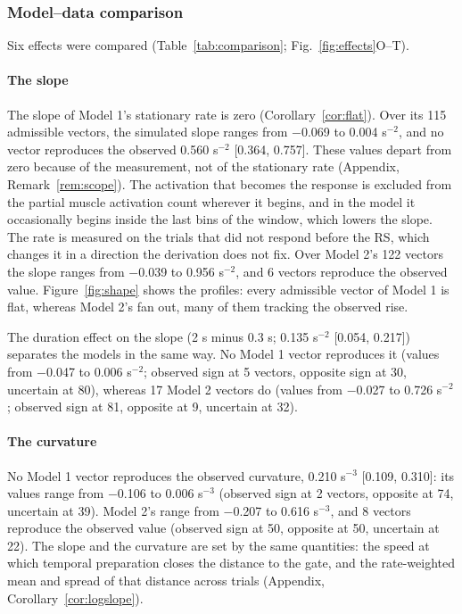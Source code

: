 \documentclass[a4paper,11pt]{article}
\theoremstyle{definition}
\newcommand{\1}{\mathbbm{1}}
\begin{document}
\subsubsection{Model--data comparison}

Six effects were compared (Table~\ref{tab:comparison}; Fig.~\ref{fig:effects}O--T).

\paragraph{The slope}

The slope of Model 1's stationary rate is zero (Corollary~\ref{cor:flat}). Over its 115 admissible vectors, the simulated slope ranges from $-$0.069 to 0.004 s$^{-2}$, and no vector reproduces the observed 0.560 s$^{-2}$ [0.364, 0.757]. These values depart from zero because of the measurement, not of the stationary rate (Appendix, Remark~\ref{rem:scope}). The activation that becomes the response is excluded from the partial muscle activation count wherever it begins, and in the model it occasionally begins inside the last bins of the window, which lowers the slope. The rate is measured on the trials that did not respond before the RS, which changes it in a direction the derivation does not fix. Over Model 2's 122 vectors the slope ranges from $-$0.039 to 0.956 s$^{-2}$, and 6 vectors reproduce the observed value. Figure~\ref{fig:shape} shows the profiles: every admissible vector of Model 1 is flat, whereas Model 2's fan out, many of them tracking the observed rise.

The duration effect on the slope (2 s minus 0.3 s; 0.135 s$^{-2}$ [0.054, 0.217]) separates the models in the same way. No Model 1 vector reproduces it (values from $-$0.047 to 0.006 s$^{-2}$; observed sign at 5 vectors, opposite sign at 30, uncertain at 80), whereas 17 Model 2 vectors do (values from $-$0.027 to 0.726 s$^{-2}$; observed sign at 81, opposite at 9, uncertain at 32).

\paragraph{The curvature}

No Model 1 vector reproduces the observed curvature, 0.210 s$^{-3}$ [0.109, 0.310]: its values range from $-$0.106 to 0.006 s$^{-3}$ (observed sign at 2 vectors, opposite at 74, uncertain at 39). Model 2's range from $-$0.207 to 0.616 s$^{-3}$, and 8 vectors reproduce the observed value (observed sign at 50, opposite at 50, uncertain at 22). The slope and the curvature are set by the same quantities: the speed at which temporal preparation closes the distance to the gate, and the rate-weighted mean and spread of that distance across trials (Appendix, Corollary~\ref{cor:logslope}).
\end{document}
